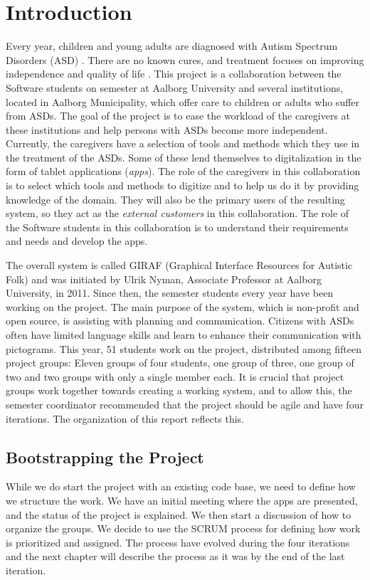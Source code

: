 \chapter{Introduction}
Every year, children and young adults are diagnosed with Autism Spectrum Disorders (ASD) \cite{autism_diagnosis_adults,autism_diagnosis_children}. There are no known cures, and treatment focuses on improving independence and quality of life \cite{Myers01112007}. This project is a collaboration between the Software students on  semester at Aalborg University and several institutions, located in Aalborg Municipality, which offer care to children or adults who suffer from ASDs. The goal of the project is to ease the workload of the caregivers at these institutions and help persons with ASDs become more independent. Currently, the caregivers have a selection of tools and methods which they use in the treatment of the ASDs. Some of these lend themselves to digitalization in the form of tablet applications (\emph{apps}). The role of the caregivers in this collaboration is to select which tools and methods to digitize and to help us do it by providing knowledge of the domain. They will also be the primary users of the resulting system, so they act as the \emph{external customers} in this collaboration. The role of the Software students in this collaboration is to understand their requirements and needs and develop the apps.

The overall system is called GIRAF (Graphical Interface Resources for Autistic Folk) and was initiated by Ulrik Nyman, Associate Professor at Aalborg University, in 2011. Since then, the  semester students every year have been working on the project. The main purpose of the system, which is non-profit and open source, is assisting with planning and communication. Citizens with ASDs often have limited language skills and learn to enhance their communication with pictograms. This year, 51 students work on the project, distributed among fifteen project groups: Eleven groups of four students, one group of three, one group of two and two groups with only a single member each. It is crucial that project groups work together towards creating a working system, and to allow this, the semester coordinator recommended that the project should be agile and have four iterations. The organization of this report reflects this.

\section{Bootstrapping the Project}
While we do start the project with an existing code base, we need to define how we structure the work. We have an initial meeting where the apps are presented, and the status of the project is explained. We then start a discussion of how to organize the groups. We decide to use the SCRUM process for defining how work is prioritized and assigned. The process have evolved during the four iterations and the next chapter will describe the process as it was by the end of the last iteration.

